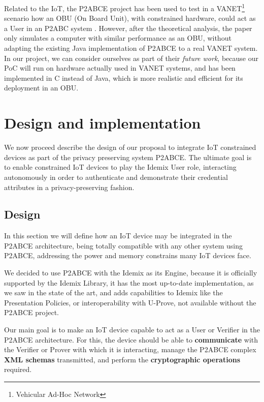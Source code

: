 \documentclass[journal]{IEEEtran}
\begin{document}
Related to the IoT, the P2ABCE project has been used to test in a VANET\footnote{Vehicular Ad-Hoc Network} scenario how an OBU (On Board Unit), with constrained hardware, could act as a User in an P2ABC system \cite{vanet}. However, after the theoretical analysis, the paper only simulates a computer with similar performance as an OBU, without adapting the existing Java implementation of P2ABCE to a real VANET system. In our project, we can consider ourselves as part of their \textit{future work}, because our PoC will run on hardware actually used in VANET systems, and has been implemented in C instead of Java, which is more realistic and efficient for its deployment in an OBU.








\section{Design and implementation}\label{ch:design}


We now proceed describe the design of our proposal to integrate IoT constrained devices as part of the privacy preserving system P2ABCE. The ultimate goal is to enable constrained IoT devices to play the Idemix User role, interacting autonomously in order to authenticate and demonstrate their credential attributes in a privacy-preserving fashion.

\subsection{Design}

In this section we will define how an IoT device may be integrated in the P2ABCE architecture, being totally compatible with any other system using P2ABCE, addressing the power and memory constrains many IoT devices face.

We decided to use P2ABCE with the Idemix as its Engine, because it is officially supported by the Idemix Library, it has the most up-to-date implementation, as we saw in the state of the art, and adds capabilities to Idemix like the Presentation Policies, or interoperability with U-Prove, not available without the P2ABCE project.

Our main goal is to make an IoT device capable to act as a User or Verifier in the P2ABCE architecture. For this, the device should be able to \textbf{communicate} with the Verifier or Prover with which it is interacting, manage the P2ABCE complex \textbf{XML schemas} transmitted, and perform the \textbf{cryptographic operations} required.
\end{document}
